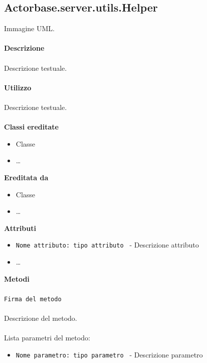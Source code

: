 \documentclass[a4paper]{article}
\begin{document}
	\subsection{Actorbase.server.utils.Helper}
		Immagine UML.
		\\ \\
		\textbf{Descrizione}
			\\ \\
			Descrizione testuale.
			\\ \\
		\textbf{Utilizzo}
			\\ \\
			Descrizione testuale.
			\\ \\
		\textbf{Classi ereditate}
			\begin{itemize}
				\item Classe
				\item \dots
			\end{itemize}
		\textbf{Ereditata da}
			\begin{itemize}
				\item Classe
				\item \dots
			\end{itemize}
		\textbf{Attributi}
			\begin{itemize}
				\item \texttt{Nome attributo: tipo attributo } - Descrizione attributo
				\item \dots
			\end{itemize}
		\textbf{Metodi}
			\\ \\
			\texttt{Firma del metodo}
			\\ \\
			Descrizione del metodo.
			\\ \\
			Lista parametri del metodo:
			\begin{itemize}
				\item \texttt{Nome parametro: tipo parametro } - Descrizione parametro
			\end{itemize}
			
\end{document}
